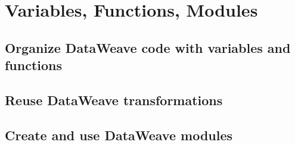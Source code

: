 \chapter{Variables, Functions, Modules}

\section{Organize DataWeave code with variables and functions}

\section{Reuse DataWeave transformations}

\section{Create and use DataWeave modules}
